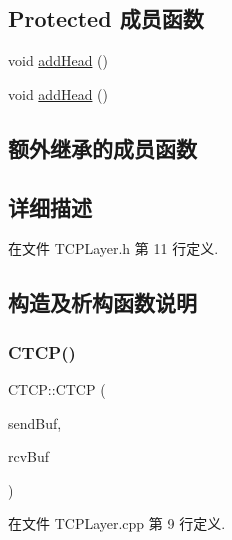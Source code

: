 \subsection*{Protected 成员函数}
\begin{DoxyCompactItemize}
\item 
void \hyperlink{class_c_t_c_p_a0c68800a3b6317cbe74aa2cb28ea3d9c}{add\+Head} ()
\item 
void \hyperlink{class_c_t_c_p_a0c68800a3b6317cbe74aa2cb28ea3d9c}{add\+Head} ()
\end{DoxyCompactItemize}
\subsection*{额外继承的成员函数}


\subsection{详细描述}


在文件 T\+C\+P\+Layer.\+h 第 11 行定义.



\subsection{构造及析构函数说明}
\mbox{\label{class_c_t_c_p_a7dee32e3cae74e448df0b4d09fea3d43}} 
\subsubsection{\texorpdfstring{C\+T\+C\+P()}{CTCP()}\hspace{0.1cm}{\footnotesize\ttfamily [1/2]}}
{\footnotesize\ttfamily C\+T\+C\+P\+::\+C\+T\+CP (\begin{DoxyParamCaption}\item[{\hyperlink{class_msg_list}{Msg\+List} \&}]{send\+Buf,  }\item[{\hyperlink{class_msg_list}{Msg\+List} \&}]{rcv\+Buf }\end{DoxyParamCaption})}



在文件 T\+C\+P\+Layer.\+cpp 第 9 行定义.

\mbox{\label{class_c_t_c_p_a5481af8e2b94bd236b2673eae11d160f}} 
